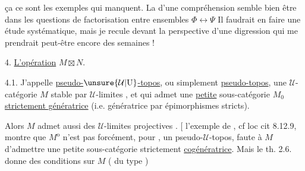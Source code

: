 ça ce sont les exemples qui manquent. La  d’une compréhension semble bien être dans les questions de factorisation entre ensembles $\Phi\longleftrightarrow\Psi$ Il faudrait en faire une étude systématique, mais je recule devant la perspective d’une digression qui me prendrait peut-être encore des semaines !

\noindent\hrulefill\par\noindent\hrulefill

4.  \uline{L’opération} $M\boxtimes N$.

4.1.  J’appelle \uline{pseudo-$\unsure{\mathcal U|\mathrm U}$-topos}, ou simplement \uline{pseudo-topos}, une $\mathcal U$-catégorie $M$ stable par $\mathcal U$-limites  , et qui admet une \uline{petite} sous-catégorie $M_0$  \uline{strictement génératrice} (i.e. génératrice par épimorphismes stricts).

Alors $M$ admet aussi des $\mathcal U$-limites projectives . [ l’exemple de , cf loc cit 8.12.9, montre que $M^{\mathrm o}$ n’est pas forcément, pour , un pseudo-$\mathcal U$-topos, faute à $M$ d’admettre une petite  sous-catégorie strictement \uline{cogénératrice}. Mais le th. 2.6. donne des conditions sur $M$ ( du type )

